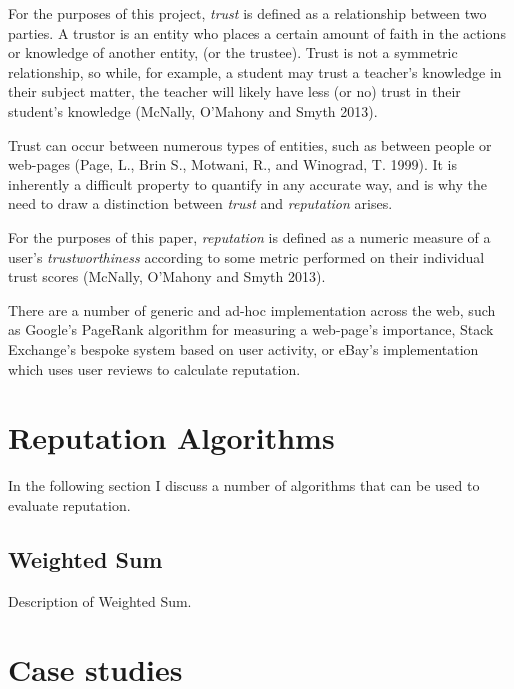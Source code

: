 \documentclass[]{final_report}
\begin{document}
For the purposes of this project, \textsl{trust} is defined as a relationship between two parties. A trustor is an entity who places a certain amount of faith in the actions or knowledge of another entity, (or the trustee). Trust is not a symmetric relationship, so while, for example, a student may trust a teacher's knowledge in their subject matter, the teacher will likely have less (or no) trust in their student's knowledge  (McNally, O'Mahony and Smyth 2013).

Trust can occur between numerous types of entities, such as between people or web-pages (Page, L., Brin S., Motwani, R., and Winograd, T. 1999). It is inherently a difficult property to quantify in any accurate way, and is why the need to draw a distinction between \textsl{trust} and \textsl{reputation} arises.

For the purposes of this paper, \textsl{reputation} is defined as a numeric measure of a user's \textsl{trustworthiness} according to some metric performed on their individual trust scores (McNally, O'Mahony and Smyth 2013).

There are a number of generic and ad-hoc implementation across the web, such as Google's PageRank algorithm for measuring a web-page's importance, Stack Exchange's bespoke system based on user activity, or eBay's implementation which uses user reviews to calculate reputation.


\section{Reputation Algorithms}
In the following section I discuss a number of algorithms that can be used to evaluate reputation.

\subsection{Weighted Sum}
Description of Weighted Sum.
\section{Case studies}
\end{document}

